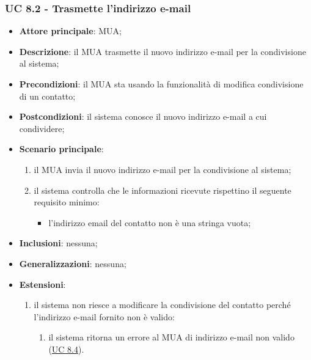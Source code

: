     \subsubsection{UC 8.2 - Trasmette l'indirizzo e-mail} \label{sec:UC8.2}
    \begin{itemize}
        \item \textbf{Attore principale}: MUA;
        \item \textbf{Descrizione}: il MUA trasmette il nuovo indirizzo e-mail per la condivisione al sistema;
        \item \textbf{Precondizioni}: il MUA sta usando la funzionalità di modifica condivisione di un contatto;
        \item \textbf{Postcondizioni}: il sistema conosce il nuovo indirizzo e-mail a cui condividere;
        \item \textbf{Scenario principale}:
            \begin{enumerate}
                \item il MUA invia il nuovo indirizzo e-mail per la condivisione al sistema;
                \item il sistema controlla che le informazioni ricevute rispettino il seguente requisito minimo:
                    \begin{itemize}
                        \item l'indirizzo email del contatto non è una stringa vuota;
                    \end{itemize}
            \end{enumerate}
        \item \textbf{Inclusioni}: nessuna;
        \item \textbf{Generalizzazioni}: nessuna;
        \item \textbf{Estensioni}:
            \begin{enumerate}[label=\alph*.]
                \item il sistema non riesce a modificare la condivisione del contatto perché l'indirizzo e-mail fornito non è valido:
                \begin{enumerate}[label=\arabic*.]
                    \item il sistema ritorna un errore al MUA di indirizzo e-mail non valido (\hyperref[sec:UC8.4]{UC 8.4}).
                \end{enumerate}
            \end{enumerate}
    \end{itemize}



